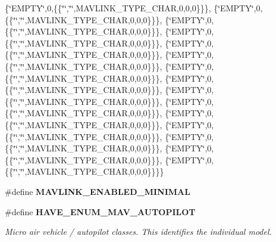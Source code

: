 \begin{DoxyCompactItemize}
\{\char`\"{}E\+M\+P\+TY\char`\"{},0,\{\{\char`\"{}\char`\"{},\char`\"{}\char`\"{},M\+A\+V\+L\+I\+N\+K\+\_\+\+T\+Y\+P\+E\+\_\+\+C\+H\+AR,0,0,0\}\}\}, \{\char`\"{}E\+M\+P\+TY\char`\"{},0,\{\{\char`\"{}\char`\"{},\char`\"{}\char`\"{},M\+A\+V\+L\+I\+N\+K\+\_\+\+T\+Y\+P\+E\+\_\+\+C\+H\+AR,0,0,0\}\}\}, \{\char`\"{}E\+M\+P\+TY\char`\"{},0,\{\{\char`\"{}\char`\"{},\char`\"{}\char`\"{},M\+A\+V\+L\+I\+N\+K\+\_\+\+T\+Y\+P\+E\+\_\+\+C\+H\+AR,0,0,0\}\}\}, \{\char`\"{}E\+M\+P\+TY\char`\"{},0,\{\{\char`\"{}\char`\"{},\char`\"{}\char`\"{},M\+A\+V\+L\+I\+N\+K\+\_\+\+T\+Y\+P\+E\+\_\+\+C\+H\+AR,0,0,0\}\}\}, \{\char`\"{}E\+M\+P\+TY\char`\"{},0,\{\{\char`\"{}\char`\"{},\char`\"{}\char`\"{},M\+A\+V\+L\+I\+N\+K\+\_\+\+T\+Y\+P\+E\+\_\+\+C\+H\+AR,0,0,0\}\}\}, \{\char`\"{}E\+M\+P\+TY\char`\"{},0,\{\{\char`\"{}\char`\"{},\char`\"{}\char`\"{},M\+A\+V\+L\+I\+N\+K\+\_\+\+T\+Y\+P\+E\+\_\+\+C\+H\+AR,0,0,0\}\}\}, \{\char`\"{}E\+M\+P\+TY\char`\"{},0,\{\{\char`\"{}\char`\"{},\char`\"{}\char`\"{},M\+A\+V\+L\+I\+N\+K\+\_\+\+T\+Y\+P\+E\+\_\+\+C\+H\+AR,0,0,0\}\}\}, \{\char`\"{}E\+M\+P\+TY\char`\"{},0,\{\{\char`\"{}\char`\"{},\char`\"{}\char`\"{},M\+A\+V\+L\+I\+N\+K\+\_\+\+T\+Y\+P\+E\+\_\+\+C\+H\+AR,0,0,0\}\}\}, \{\char`\"{}E\+M\+P\+TY\char`\"{},0,\{\{\char`\"{}\char`\"{},\char`\"{}\char`\"{},M\+A\+V\+L\+I\+N\+K\+\_\+\+T\+Y\+P\+E\+\_\+\+C\+H\+AR,0,0,0\}\}\}, \{\char`\"{}E\+M\+P\+TY\char`\"{},0,\{\{\char`\"{}\char`\"{},\char`\"{}\char`\"{},M\+A\+V\+L\+I\+N\+K\+\_\+\+T\+Y\+P\+E\+\_\+\+C\+H\+AR,0,0,0\}\}\}, \{\char`\"{}E\+M\+P\+TY\char`\"{},0,\{\{\char`\"{}\char`\"{},\char`\"{}\char`\"{},M\+A\+V\+L\+I\+N\+K\+\_\+\+T\+Y\+P\+E\+\_\+\+C\+H\+AR,0,0,0\}\}\}, \{\char`\"{}E\+M\+P\+TY\char`\"{},0,\{\{\char`\"{}\char`\"{},\char`\"{}\char`\"{},M\+A\+V\+L\+I\+N\+K\+\_\+\+T\+Y\+P\+E\+\_\+\+C\+H\+AR,0,0,0\}\}\}, \{\char`\"{}E\+M\+P\+TY\char`\"{},0,\{\{\char`\"{}\char`\"{},\char`\"{}\char`\"{},M\+A\+V\+L\+I\+N\+K\+\_\+\+T\+Y\+P\+E\+\_\+\+C\+H\+AR,0,0,0\}\}\}, \{\char`\"{}E\+M\+P\+TY\char`\"{},0,\{\{\char`\"{}\char`\"{},\char`\"{}\char`\"{},M\+A\+V\+L\+I\+N\+K\+\_\+\+T\+Y\+P\+E\+\_\+\+C\+H\+AR,0,0,0\}\}\}, \{\char`\"{}E\+M\+P\+TY\char`\"{},0,\{\{\char`\"{}\char`\"{},\char`\"{}\char`\"{},M\+A\+V\+L\+I\+N\+K\+\_\+\+T\+Y\+P\+E\+\_\+\+C\+H\+AR,0,0,0\}\}\}\}
\item 
\#define \textbf{ M\+A\+V\+L\+I\+N\+K\+\_\+\+E\+N\+A\+B\+L\+E\+D\+\_\+\+M\+I\+N\+I\+M\+AL}
\item 
\#define \textbf{ H\+A\+V\+E\+\_\+\+E\+N\+U\+M\+\_\+\+M\+A\+V\+\_\+\+A\+U\+T\+O\+P\+I\+L\+OT}
\begin{DoxyCompactList}\small\item\em Micro air vehicle / autopilot classes. This identifies the individual model. \end{DoxyCompactList}\item 

\end{DoxyCompactItemize}
